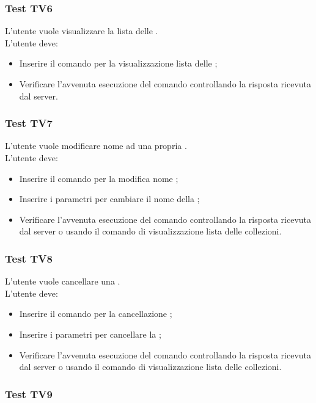 \documentclass{scalatekids-article}
\begin{document}
\subsubsection{Test TV6}

L'utente vuole visualizzare la lista delle .\\
L'utente deve:
\begin{itemize}
\item Inserire il comando per la visualizzazione lista delle ;
\item Verificare l'avvenuta esecuzione del comando controllando la risposta ricevuta dal server.
\end{itemize}

\subsubsection{Test TV7}

L'utente vuole modificare nome ad una propria .\\
L'utente deve:
\begin{itemize}
\item Inserire il comando per la modifica nome ;
\item Inserire i parametri per cambiare il nome della ;
\item Verificare l'avvenuta esecuzione del comando controllando la risposta ricevuta dal server o usando il comando di visualizzazione lista delle collezioni.
\end{itemize}

\subsubsection{Test TV8}

L'utente vuole cancellare una .\\
L'utente deve:
\begin{itemize}
\item Inserire il comando per la cancellazione ;
\item Inserire i parametri per cancellare la ;
\item Verificare l'avvenuta esecuzione del comando controllando la risposta ricevuta dal server o usando il comando di visualizzazione lista delle collezioni.
\end{itemize}

\subsubsection{Test TV9}
\end{document}
